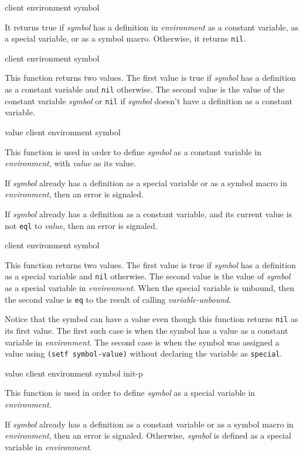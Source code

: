  {client environment symbol}

It returns true if \textit{symbol} has a definition in
\textit{environment} as a constant variable, as a special variable, or
as a symbol macro.  Otherwise, it returns \texttt{nil}.

 {client environment symbol}

This function returns two values. The first value is true if \textit{symbol}
has a definition as a constant variable and \texttt{nil} otherwise. The second
value is the value of the constant variable \textit{symbol} or \texttt{nil} if
\textit{symbol} doesn't have a definition as a constant variable.

 {value client environment symbol}

This function is used in order to define \textit{symbol} as a constant
variable in \textit{environment}, with \textit{value} as its value.

If \textit{symbol} already has a definition as a special variable or
as a symbol macro in \textit{environment}, then an error is signaled.

If \textit{symbol} already has a definition as a constant variable,
and its current value is not \texttt{eql} to \textit{value}, then an
error is signaled.

 {client environment symbol}

This function returns two values. The first value is true if \textit{symbol}
has a definition as a special variable and \texttt{nil} otherwise. The second
value is the value of \textit{symbol} as a special variable in
\textit{environment}. When the special variable is unbound, then the second
value is \texttt{eq} to the result of calling \textit{variable-unbound}.

Notice that the symbol can have a value even though this function returns
\texttt{nil} as its first value.  The first such case is when the symbol has a
value as a constant variable in \textit{environment}.  The second case is when
the symbol was assigned a value using \texttt{(setf symbol-value)} without
declaring the variable as \texttt{special}.

 {value client environment symbol init-p}

This function is used in order to define \textit{symbol} as a special
variable in \textit{environment}.

If \textit{symbol} already has a definition as a constant variable or
as a symbol macro in \textit{environment}, then an error is signaled.
Otherwise, \textit{symbol} is defined as a special variable in
\textit{environment}.

